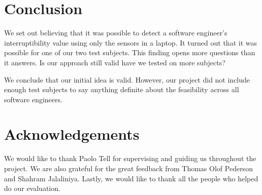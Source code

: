 \documentclass{sigchi}
\begin{document}
\section{Conclusion}
We set out believing that it was possible to detect a software engineer's interruptibility value using only the sensors in a laptop.
It turned out that it was possible for one of our two test subjects.
This finding opens more questions than it answers. Is our approach still valid have we tested on more subjects?

We conclude that our initial idea is valid.
However, our project did not include enough test subjects to say anything definite about the feasibility across all software engineers.

\section{Acknowledgements}
We would like to thank Paolo Tell for supervising and guiding us throughout the project.
We are also grateful for the great feedback from Thomas Olof Pederson and Shahram Jalaliniya.
Lastly, we would like to thank all the people who helped do our evaluation.

\balance


\end{document}
